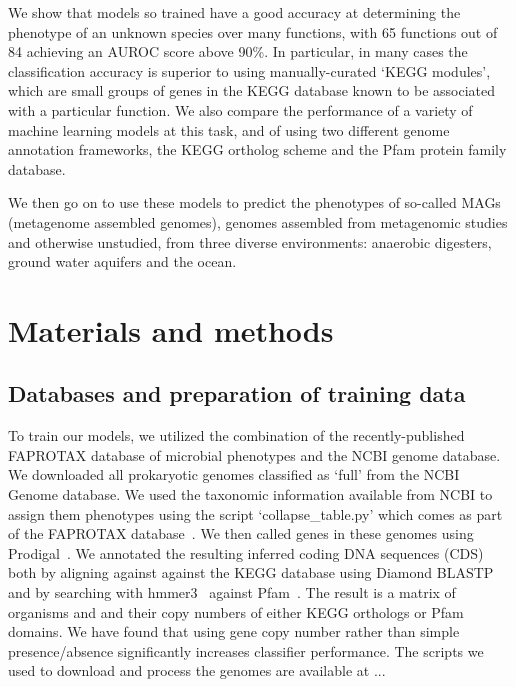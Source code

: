 \documentclass[10pt,letterpaper]{article}
\begin{document}
We show that models so trained have a good accuracy at determining the phenotype of an unknown species over many functions, with 65 functions out of 84 achieving an AUROC score above 90\%. In particular, in many cases the classification accuracy is superior to using manually-curated `KEGG modules', which are small groups of genes in the KEGG database known to be associated with a particular function. We also compare the performance of a variety of machine learning models at this task, and of using two different genome annotation frameworks, the KEGG ortholog scheme and the Pfam protein family database. 

We then go on to use these models to predict the phenotypes of so-called MAGs (metagenome assembled genomes), genomes assembled from metagenomic studies and otherwise unstudied, from three diverse environments: anaerobic digesters, ground water aquifers and the ocean.  


\section*{Materials and methods}
\subsection*{Databases and preparation of training data}
To train our models, we utilized the combination of the recently-published FAPROTAX database of microbial phenotypes and the NCBI genome database. We downloaded all prokaryotic genomes classified as `full' from the NCBI Genome database. We used the taxonomic information available from NCBI to assign them phenotypes using the script `collapse\_table.py' which comes as part of the FAPROTAX database~\cite{Louca2016}. We then called genes in these genomes using Prodigal~\cite{Hyatt2010}. We annotated the resulting inferred coding DNA sequences (CDS) both by aligning against against the KEGG database using Diamond BLASTP~\cite{Buchfink2014} and by searching with hmmer3~\cite{Eddy2011} against Pfam~\cite{Finn2016}. The result is a matrix of organisms and and their copy numbers of either KEGG orthologs or Pfam domains. We have found that using gene copy number rather than simple presence/absence significantly increases classifier performance. The scripts we used to download and process the genomes are available at ...
\end{document}
